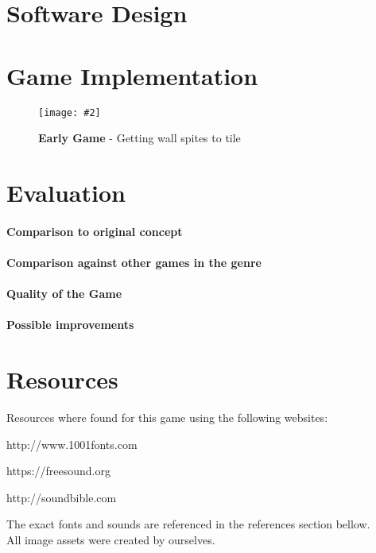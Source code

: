 \documentclass[10pt, a4paper]{article}
\newcommand{\figuremacro}[5]{
    \begin{figure}[#1]
        \centering
        \texttt{[image: \#2]}
        \caption[#3]{\textbf{#3}#4}
        \label{fig:#2}
    \end{figure}
}
\begin{document}
	\section{Software Design}
	
	\section{Game Implementation}
	
	\figuremacro{h}{Walls}{Early Game}{ - Getting wall spites to tile}{1.0}
	\section{Evaluation}
	
	\paragraph{Comparison to original concept}
	\paragraph{Comparison against other games in the genre}
	\paragraph{Quality of the Game}
	\paragraph{Possible improvements}
	
	\section{Resources}
	Resources where found for this game using the following websites:
	
	http://www.1001fonts.com
	
	https://freesound.org
	
	http://soundbible.com
	
	The exact fonts and sounds are referenced in the references section bellow.\\
	
	All image assets were created by ourselves.
	
\end{document}
